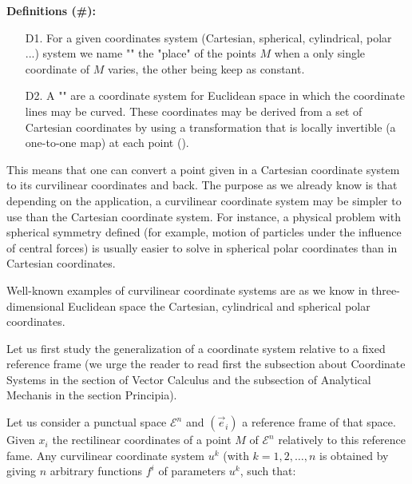	\textbf{Definitions (\#\mydef):} 
	\begin{enumerate}
		\item[D1.] For a given coordinates system (Cartesian, spherical, cylindrical, polar ...) system we name "" the "place" of the points $M$ when a only single coordinate of $M$ varies, the other being keep as constant.

		\item[D2.] A "" are a coordinate system for Euclidean space in which the coordinate lines may be curved. These coordinates may be derived from a set of Cartesian coordinates by using a transformation that is locally invertible (a one-to-one map) at each point ().
	\end{enumerate}
	 This means that one can convert a point given in a Cartesian coordinate system to its curvilinear coordinates and back. The purpose as we already know is that depending on the application, a curvilinear coordinate system may be simpler to use than the Cartesian coordinate system. For instance, a physical problem with spherical symmetry defined (for example, motion of particles under the influence of central forces) is usually easier to solve in spherical polar coordinates than in Cartesian coordinates.
	 
	 Well-known examples of curvilinear coordinate systems are as we know in three-dimensional Euclidean space the Cartesian, cylindrical and spherical polar coordinates.
	 
	 Let us first study the generalization of a coordinate system relative to a fixed reference frame (we urge the reader to read first the subsection about Coordinate Systems in the section of Vector Calculus and the subsection of Analytical Mechanis in the section Principia).
	 
	 Let us consider a punctual space $\mathcal{E}^n$ and $(\vec{e}_i)$ a reference frame of that space. Given $x_i$ the rectilinear coordinates of a point $M$ of $\mathcal{E}^n$ relatively to this reference fame. Any curvilinear coordinate system $u^k$ (with $k=1,2,\ldots,n$ is obtained by giving $n$ arbitrary functions $f^i$ of parameters $u^k$, such that:
	 
